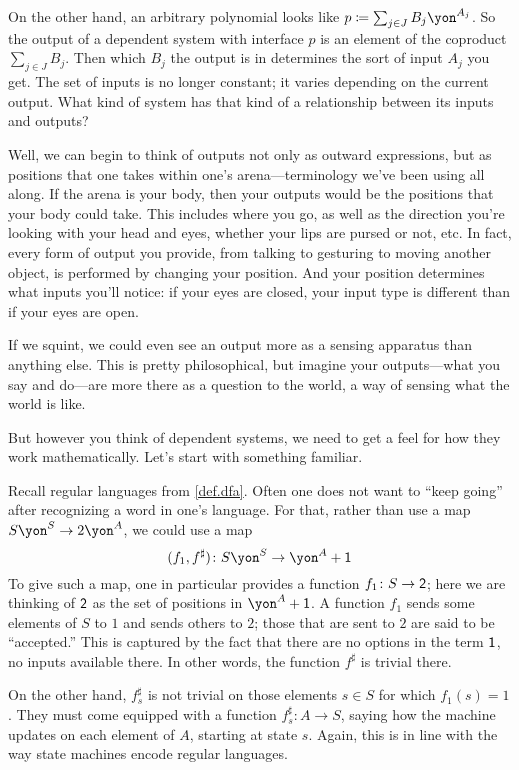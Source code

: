 \documentclass[Book-Poly]{subfiles}
\begin{document}
On the other hand, an arbitrary polynomial looks like $p\coloneqq\sum_{j \in J} B_j\yon^{A_j}$.
So the output of a dependent system with interface $p$ is an element of the coproduct $\sum_{j \in J} B_j$.
Then which $B_j$ the output is in determines the sort of input $A_j$ you get.
The set of inputs is no longer constant; it varies depending on the current output.
What kind of system has that kind of a relationship between its inputs and outputs?

Well, we can begin to think of outputs not only as outward expressions, but as positions that one takes within one's arena---terminology we've been using all along.
If the arena is your body, then your outputs would be the positions that your body could take.
This includes where you go, as well as the direction you're looking with your head and eyes, whether your lips are pursed or not, etc.
In fact, every form of output you provide, from talking to gesturing to moving another object, is performed by changing your position. And your position determines what inputs you'll notice: if your eyes are closed, your input type is different than if your eyes are open.


If we squint, we could even see an output more as a sensing apparatus than anything else. This is pretty philosophical, but imagine your outputs---what you say and do---are more there as a question to the world, a way of sensing what the world is like.

But however you think of dependent systems, we need to get a feel for how they work mathematically. Let's start with something familiar.

\begin{example}\label{ex.regular_lang_stop}
Recall regular languages from \cref{def.dfa}. Often one does not want to ``keep going'' after recognizing a word in one's language. For that, rather than use a map $S\yon^S\to 2\yon^A$, we could use a map
\[
(f_1,f^\sharp)\colon S\yon^S\to \yon^A+\1
\]
To give such a map, one in particular provides a function $f_1\colon S\to\textsf{2}$; here we are thinking of $\textsf{2}$ as the set of positions in $\yon^A+\1$. A function $f_1$ sends some elements of $S$ to $1$ and sends others to $2$; those that are sent to $2$ are said to be ``accepted.'' This is captured by the fact that there are no options in the term $\textsf{1}$, no inputs available there. In other words, the function $f^\sharp$ is trivial there.

On the other hand, $f^\sharp_s$ is not trivial on those elements $s\in S$ for which $f_1(s)=1$. They must come equipped with a function $f^\sharp_s\colon A\to S$, saying how the machine updates on each element of $A$, starting at state $s$. Again, this is in line with the way state machines encode regular languages.
\end{example}
\end{document}

